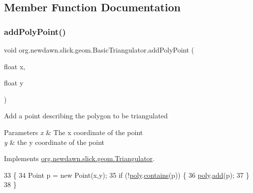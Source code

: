 \subsection{Member Function Documentation}
\mbox{\label{classorg_1_1newdawn_1_1slick_1_1geom_1_1_basic_triangulator_a72549d87e657743bc012c0a34784751c}} 
\subsubsection{\texorpdfstring{add\+Poly\+Point()}{addPolyPoint()}}
{\footnotesize\ttfamily void org.\+newdawn.\+slick.\+geom.\+Basic\+Triangulator.\+add\+Poly\+Point (\begin{DoxyParamCaption}\item[{float}]{x,  }\item[{float}]{y }\end{DoxyParamCaption})\hspace{0.3cm}{\ttfamily [inline]}}

Add a point describing the polygon to be triangulated


\begin{DoxyParams}{Parameters}
{\em x} & The x coordinate of the point \\
\hline
{\em y} & the y coordinate of the point \\
\hline
\end{DoxyParams}


Implements \mbox{\hyperlink{interfaceorg_1_1newdawn_1_1slick_1_1geom_1_1_triangulator_a32b11eccb582c7f4993a944df0b1db65}{org.\+newdawn.\+slick.\+geom.\+Triangulator}}.


\begin{DoxyCode}
33                                                \{
34         Point p = \textcolor{keyword}{new} Point(x,y);
35         \textcolor{keywordflow}{if} (!\mbox{\hyperlink{classorg_1_1newdawn_1_1slick_1_1geom_1_1_basic_triangulator_ae57823930e5e5413052560e8c85eb92a}{poly}}.\mbox{\hyperlink{classorg_1_1newdawn_1_1slick_1_1geom_1_1_basic_triangulator_1_1_point_list_a13c2cbedb044688c7b46d2d4932fce51}{contains}}(p)) \{
36             \mbox{\hyperlink{classorg_1_1newdawn_1_1slick_1_1geom_1_1_basic_triangulator_ae57823930e5e5413052560e8c85eb92a}{poly}}.\mbox{\hyperlink{classorg_1_1newdawn_1_1slick_1_1geom_1_1_basic_triangulator_1_1_point_list_aa9a80da4d541df0ea80e5c77aada368e}{add}}(p);
37         \}
38     \}
\end{DoxyCode}
\mbox{\label{classorg_1_1newdawn_1_1slick_1_1geom_1_1_basic_triangulator_ade8b558b3ec5771bf8313f841d9aba9a}} 
